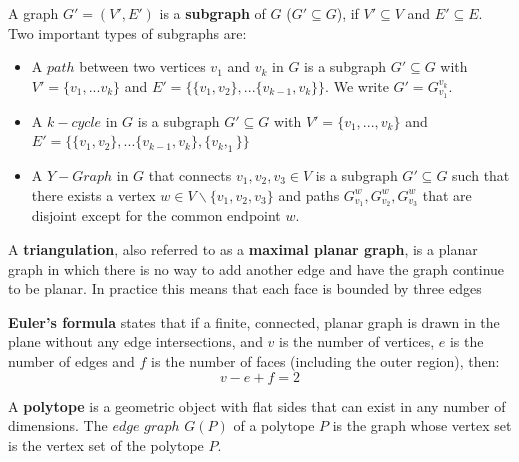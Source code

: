 \documentclass[english]{article}
\begin{document}
  A graph $G' = (V',E')$ is a \textbf{subgraph} of $G$ ($G' \subseteq G$), if $V' \subseteq V$ and $E' \subseteq E$. Two important types of subgraphs are:
  \begin{itemize}
  \item A $path$ between two vertices $v_1$ and $v_k$ in $G$ is a subgraph $G' \subseteq G$ with $V' = \{v_1,...v_k\}$ and $E' 	= \{\{v_1,v_2\},...\{v_{k-1}, v_k\}\}$. We write $G' = G_{v_1}^{v_k}$.
  \item A $k-cycle$ in $G$ is a subgraph $G'\subseteq G$ with $V' = \{v_1,...,v_k\}$ and $E' = \{\{v_1,v_2\},...\{v_{k-1}, v_k\}, \{v_k,_1\}\}$
  \item A $Y-Graph$ in $G$ that connects $v_1,v_2, v_3 \in V$ is a subgraph $G' \subseteq G$ such that there exists a vertex $w \in V \backslash \{v_1,v_2, v_3\}$ and paths $G_{v_1}^w, G_{v_2}^w, G_{v_3}^w$ that are disjoint except for the common endpoint $w$.
  \end{itemize}
  A \textbf{triangulation}, also referred to as a \textbf{maximal planar graph}, is a planar graph in which there is no way to add another edge and have the graph continue to be planar. In practice this means that each face is bounded by three edges
  
  \textbf{Euler's formula} states that if a finite, connected, planar graph is drawn in the plane without any edge intersections, and $v$ is the number of vertices, $e$ is the number of edges and $f$ is the number of faces (including the outer region), then: 
  \begin{equation} 
	v-e+f=2
  \end{equation}
  
  A \textbf{polytope} is a geometric object with flat sides that can exist in any number of dimensions. The $edge$ $graph$ $G(P)$ of a polytope $P$ is the graph whose vertex set is the vertex set of the polytope $P$. 
  
\end{document}
